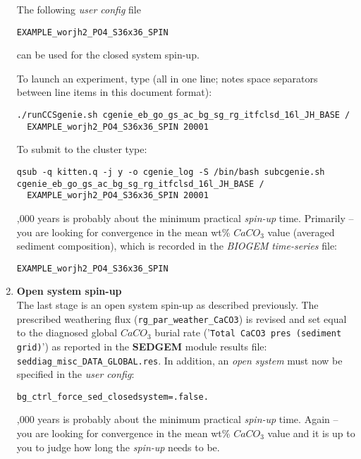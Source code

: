 \documentclass[11pt,fleqn]{book} %
\begin{document}
\begin{enumerate}
The following \textit{user config} file
\vspace{-1mm}\begin{verbatim}EXAMPLE_worjh2_PO4_S36x36_SPIN\end{verbatim}\vspace{-1mm}
can be used for the closed system spin-up.

\noindent To launch an experiment, type (all in one line; notes space separators between line items in this document format):
\vspace{-1mm}\begin{verbatim}
./runCCSgenie.sh cgenie_eb_go_gs_ac_bg_sg_rg_itfclsd_16l_JH_BASE /
  EXAMPLE_worjh2_PO4_S36x36_SPIN 20001
\end{verbatim}\vspace{-1mm}

\noindent To submit to the cluster type:
\vspace{-1mm}\begin{verbatim}qsub -q kitten.q -j y -o cgenie_log -S /bin/bash subcgenie.sh
cgenie_eb_go_gs_ac_bg_sg_rg_itfclsd_16l_JH_BASE /
  EXAMPLE_worjh2_PO4_S36x36_SPIN 20001
\end{verbatim}\vspace{-1mm}

,000 years is probably about the minimum practical \textit{spin-up} time. Primarily -- you are looking for convergence in the mean wt\% \(CaCO_{3}\) value (averaged sediment composition), which is recorded in the \textit{BIOGEM} \textit{time-series} file:
\vspace{-1mm}\begin{verbatim}EXAMPLE_worjh2_PO4_S36x36_SPIN\end{verbatim}\vspace{-1mm}

\vspace{1mm}
\item \textbf{Open system spin-up}
\\The last stage is an open system spin-up as described previously. The prescribed weathering flux (\texttt{rg\_par\_weather\_CaCO3}) is revised and set equal to the diagnosed global \(CaCO_{3}\) burial rate ('\texttt{Total CaCO3 pres (sediment grid)}') as reported in the \textbf{SEDGEM} module results file:
\\\texttt{seddiag\_misc\_DATA\_GLOBAL.res}.
In addition, an \textit{open system} must now be specified in the \textit{user config}:
\vspace{-1mm}\begin{verbatim}bg_ctrl_force_sed_closedsystem=.false.\end{verbatim}\vspace{-1mm}

,000 years is probably about the minimum practical \textit{spin-up} time. Again -- you are looking for convergence in the mean wt\% \(CaCO_{3}\) value and it is up to you to judge how long the \textit{spin-up} needs to be.

\end{enumerate}
\end{document}
